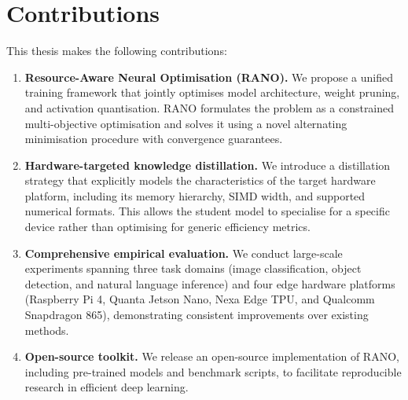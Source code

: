 \section{Contributions}

This thesis makes the following contributions:

\begin{enumerate}[label=\textbf{C\arabic*},leftmargin=3em]
  \item \textbf{Resource-Aware Neural Optimisation (RANO).} We propose a
  unified training framework that jointly optimises model architecture,
  weight pruning, and activation quantisation. RANO formulates the
  problem as a constrained multi-objective optimisation and solves it
  using a novel alternating minimisation procedure with convergence
  guarantees.

  \item \textbf{Hardware-targeted knowledge distillation.} We introduce a
  distillation strategy that explicitly models the characteristics of the
  target hardware platform, including its memory hierarchy, SIMD width,
  and supported numerical formats. This allows the student model to
  specialise for a specific device rather than optimising for generic
  efficiency metrics.

  \item \textbf{Comprehensive empirical evaluation.} We conduct
  large-scale experiments spanning three task domains (image
  classification, object detection, and natural language inference)
  and four edge hardware platforms (Raspberry Pi 4, Quanta Jetson Nano,
  Nexa Edge TPU, and Qualcomm Snapdragon 865), demonstrating consistent
  improvements over existing methods.

  \item \textbf{Open-source toolkit.} We release an open-source
  implementation of RANO, including pre-trained models and benchmark
  scripts, to facilitate reproducible research in efficient deep
  learning.
\end{enumerate}
